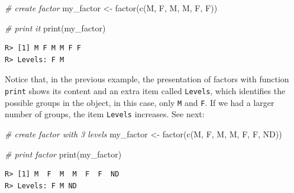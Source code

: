 \documentclass[
  12pt,
]{book}
\newenvironment{Shaded}{\begin{snugshade}}{\end{snugshade}}
\newcommand{\CommentTok}[1]{\textcolor[rgb]{0.37,0.37,0.37}{\textit{#1}}}
\newcommand{\FunctionTok}[1]{\textcolor[rgb]{0,0,0}{#1}}
\newcommand{\NormalTok}[1]{#1}
\newcommand{\OtherTok}[1]{\textcolor[rgb]{0.37,0.37,0.37}{#1}}
\newcommand{\StringTok}[1]{\textcolor[rgb]{0.5,0.5,0.5}{#1}}
\begin{document}
\begin{Shaded}
\begin{Highlighting}[]
\CommentTok{\# create factor}
\NormalTok{my\_factor }\OtherTok{\textless{}{-}} \FunctionTok{factor}\NormalTok{(}\FunctionTok{c}\NormalTok{(}\StringTok{\textquotesingle{}M\textquotesingle{}}\NormalTok{, }\StringTok{\textquotesingle{}F\textquotesingle{}}\NormalTok{, }\StringTok{\textquotesingle{}M\textquotesingle{}}\NormalTok{,}
                      \StringTok{\textquotesingle{}M\textquotesingle{}}\NormalTok{, }\StringTok{\textquotesingle{}F\textquotesingle{}}\NormalTok{, }\StringTok{\textquotesingle{}F\textquotesingle{}}\NormalTok{))}

\CommentTok{\# print it}
\FunctionTok{print}\NormalTok{(my\_factor)}
\end{Highlighting}
\end{Shaded}

\begin{verbatim}
R> [1] M F M M F F
R> Levels: F M
\end{verbatim}

Notice that, in the previous example, the presentation of factors with function \texttt{print} shows its content and an extra item called \texttt{Levels}, which identifies the possible groups in the object, in this case, only \texttt{M} and \texttt{F}. If we had a larger number of groups, the item \texttt{Levels} increases. See next: 

\begin{Shaded}
\begin{Highlighting}[]
\CommentTok{\# create factor with 3 levels}
\NormalTok{my\_factor }\OtherTok{\textless{}{-}} \FunctionTok{factor}\NormalTok{(}\FunctionTok{c}\NormalTok{(}\StringTok{\textquotesingle{}M\textquotesingle{}}\NormalTok{, }\StringTok{\textquotesingle{}F\textquotesingle{}}\NormalTok{, }\StringTok{\textquotesingle{}M\textquotesingle{}}\NormalTok{, }
                      \StringTok{\textquotesingle{}M\textquotesingle{}}\NormalTok{, }\StringTok{\textquotesingle{}F\textquotesingle{}}\NormalTok{, }\StringTok{\textquotesingle{}F\textquotesingle{}}\NormalTok{,}
                      \StringTok{\textquotesingle{}ND\textquotesingle{}}\NormalTok{))}

\CommentTok{\# print factor}
\FunctionTok{print}\NormalTok{(my\_factor)}
\end{Highlighting}
\end{Shaded}

\begin{verbatim}
R> [1] M  F  M  M  F  F  ND
R> Levels: F M ND
\end{verbatim}
\end{document}
